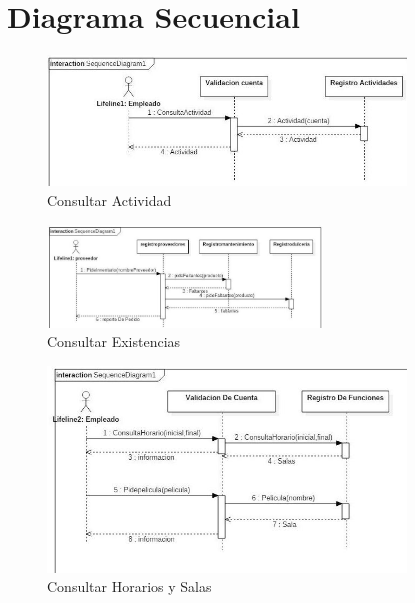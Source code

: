 \documentclass[12pt, fleqn]{report}                             %
\begin{document}
    \clearpage
    \section{Diagrama Secuencial}


        \begin{figure}[ht]
            \centering
            \includegraphics[width=0.85\textwidth]{DiagramaSecuencial1}
            \caption{Consultar Actividad}
        \end{figure}


        \begin{figure}[ht]
            \centering
            \includegraphics[width=0.65\textwidth]{DiagramaSecuencial2}
            \caption{Consultar Existencias}
        \end{figure}

        \begin{figure}[ht]
            \centering
            \includegraphics[width=0.85\textwidth]{DiagramaSecuencial3}
            \caption{Consultar Horarios y Salas}
        \end{figure}
\end{document}
